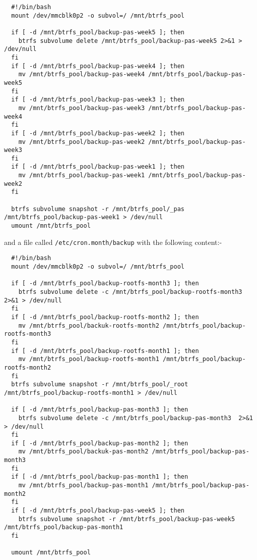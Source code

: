 \documentclass[Draft]{akc}
\begin{document}
\begin{lstlisting}
  #!/bin/bash
  mount /dev/mmcblk0p2 -o subvol=/ /mnt/btrfs_pool

  if [ -d /mnt/btrfs_pool/backup-pas-week5 ]; then
    btrfs subvolume delete /mnt/btrfs_pool/backup-pas-week5 2>&1 > /dev/null
  fi
  if [ -d /mnt/btrfs_pool/backup-pas-week4 ]; then
    mv /mnt/btrfs_pool/backup-pas-week4 /mnt/btrfs_pool/backup-pas-week5
  fi
  if [ -d /mnt/btrfs_pool/backup-pas-week3 ]; then
    mv /mnt/btrfs_pool/backup-pas-week3 /mnt/btrfs_pool/backup-pas-week4
  fi
  if [ -d /mnt/btrfs_pool/backup-pas-week2 ]; then
    mv /mnt/btrfs_pool/backup-pas-week2 /mnt/btrfs_pool/backup-pas-week3
  fi
  if [ -d /mnt/btrfs_pool/backup-pas-week1 ]; then
    mv /mnt/btrfs_pool/backup-pas-week1 /mnt/btrfs_pool/backup-pas-week2
  fi

  btrfs subvolume snapshot -r /mnt/btrfs_pool/_pas /mnt/btrfs_pool/backup-pas-week1 > /dev/null
  umount /mnt/btrfs_pool

\end{lstlisting}

and a file called \texttt{/etc/cron.month/backup} with the following content:-

\begin{lstlisting}
  #!/bin/bash
  mount /dev/mmcblk0p2 -o subvol=/ /mnt/btrfs_pool

  if [ -d /mnt/btrfs_pool/backup-rootfs-month3 ]; then
    btrfs subvolume delete -c /mnt/btrfs_pool/backup-rootfs-month3 2>&1 > /dev/null
  fi
  if [ -d /mnt/btrfs_pool/backup-rootfs-month2 ]; then
    mv /mnt/btrfs_pool/backuk-rootfs-month2 /mnt/btrfs_pool/backup-rootfs-month3
  fi
  if [ -d /mnt/btrfs_pool/backup-rootfs-month1 ]; then
    mv /mnt/btrfs_pool/backup-rootfs-month1 /mnt/btrfs_pool/backup-rootfs-month2
  fi
  btrfs subvolume snapshot -r /mnt/btrfs_pool/_root /mnt/btrfs_pool/backup-rootfs-month1 > /dev/null

  if [ -d /mnt/btrfs_pool/backup-pas-month3 ]; then
    btrfs subvolume delete -c /mnt/btrfs_pool/backup-pas-month3  2>&1 > /dev/null
  fi
  if [ -d /mnt/btrfs_pool/backup-pas-month2 ]; then
    mv /mnt/btrfs_pool/backuk-pas-month2 /mnt/btrfs_pool/backup-pas-month3
  fi
  if [ -d /mnt/btrfs_pool/backup-pas-month1 ]; then
    mv /mnt/btrfs_pool/backup-pas-month1 /mnt/btrfs_pool/backup-pas-month2
  fi
  if [ -d /mnt/btrfs_pool/backup-pas-week5 ]; then
    btrfs subvolume snapshot -r /mnt/btrfs_pool/backup-pas-week5 /mnt/btrfs_pool/backup-pas-month1
  fi

  umount /mnt/btrfs_pool

\end{lstlisting}
\end{document}
